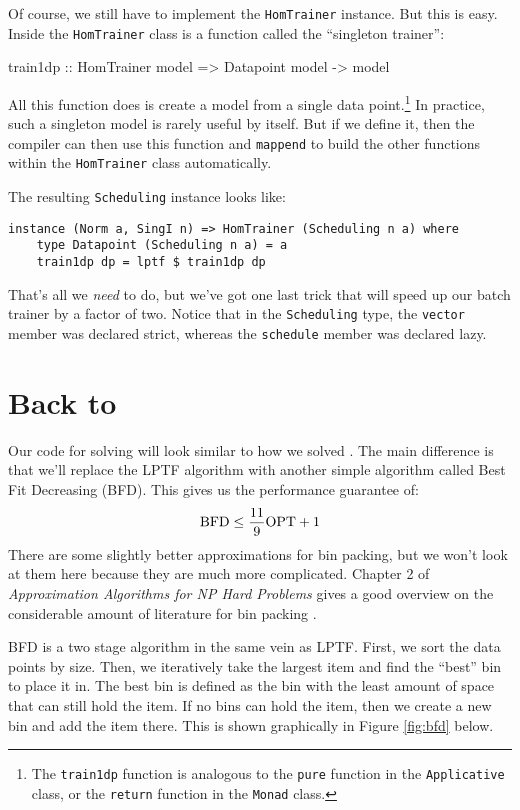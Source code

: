 \documentclass[tikz]{tmr}
\newcommand\h{\lstinline}
\newcommand{\prob}[1]{{\sc {#1}}}
\newcommand\+{\mdoubleplus}
\begin{document}
Of course, we still have to implement the \h{HomTrainer} instance.
But this is easy.
Inside the \h{HomTrainer} class is a function called the ``singleton trainer'':
\begin{spec}
train1dp :: HomTrainer model => Datapoint model -> model
\end{spec}
All this function does is create a model from a single data point.\footnote{The \h{train1dp} function is analogous to the \h{pure} function in the \h{Applicative} class, or the \h{return} function in the \h{Monad} class.}
In practice, such a singleton model is rarely useful by itself.
But if we define it, then the compiler can then use this function and \h{mappend} to build the other functions within the \h{HomTrainer} class automatically.

The resulting \h{Scheduling} instance looks like:
\begin{lstlisting}
instance (Norm a, SingI n) => HomTrainer (Scheduling n a) where
    type Datapoint (Scheduling n a) = a
    train1dp dp = lptf $ train1dp dp
\end{lstlisting}

That's all we \textit{need} to do, but we've got one last trick that will speed up our batch trainer by a factor of two.
Notice that in the \h{Scheduling} type, the \h{vector} member was declared strict, whereas the \h{schedule} member was declared lazy.


\section{Back to \prob{Bin Packing}}

Our code for solving \prob{Bin Packing} will look similar to how we solved \prob{Scheduling}.
The main difference is that we'll replace the LPTF algorithm with another simple algorithm called Best Fit Decreasing (BFD).  This gives us the performance guarantee of:
$$
\text{BFD} \le {11\over9}\text{OPT} + 1
$$
There are some slightly better approximations for bin packing, but we won't look at them here because they are much more complicated.
Chapter 2 of \textit{Approximation Algorithms for NP Hard Problems} gives a good overview on the considerable amount of literature for bin packing \cite{hochbaum96binpacking}.

BFD is a two stage algorithm in the same vein as LPTF.
First, we sort the data points by size.
Then, we iteratively take the largest item and find the ``best'' bin to place it in.
The best bin is defined as the bin with the least amount of space that can still hold the item.
If no bins can hold the item, then we create a new bin and add the item there.
This is shown graphically in Figure \ref{fig:bfd} below.
\end{document}

